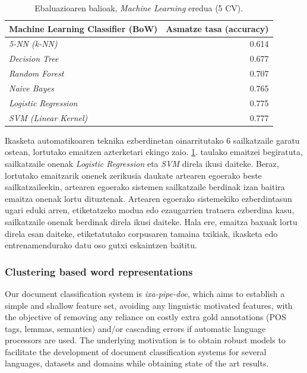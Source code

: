 \documentclass[information,article,submit,moreauthors,pdftex,10pt,a4paper]{Definitions/mdpi}
\begin{document}
\begin{table}[H]
  \centering
  \begin{tabular}{|l|r|}
    \hline
    \textbf{Machine Learning Classifier (BoW)} & \textbf{Asmatze tasa (accuracy)} \\ \hline 
    \textit{5-NN (k-NN)} &  0.614 \\ \hline
    \textit{Decision Tree} &  0.677 \\ \hline
    \textit{Random Forest} &  0.707 \\ \hline
    \textit{Naive Bayes} & 0.765 \\ \hline
    \textit{Logistic Regression} & 0.775 \\ \hline
    \textit{SVM (Linear Kernel)} & 0.777 \\ \hline
  \end{tabular}
  \caption{Ebaluazioaren balioak, \textit{Machine Learning} eredua (5 CV).}
  \label{tab:acc-ml}
\end{table}

Ikasketa automatikoaren teknika ezberdinetan oinarritutako 6 sailkatzaile garatu ostean, lortutako emaitzen azterketari ekingo zaio. \ref{tab:acc-ml}. taulako emaitzei begiratuta, sailkatzaile onenak \textit{Logistic Regression} eta \textit{SVM} direla ikusi daiteke. Beraz, lortutako emaitzarik onenek zerikusia daukate artearen egoerako beste sailkatzaileekin, artearen egoerako sistemen sailkatzaile berdinak izan baitira emaitza onenak lortu dituztenak. Artearen egoerako sistemekiko ezberdintasun ugari eduki arren, etiketatzeko modua edo ezaugarrien trataera ezberdina kasu, sailkatzaile onenak berdinak direla ikusi daiteke. Hala ere, emaitza baxuak lortu direla esan daiteke, etiketatutako corpusaren tamaina txikiak, ikasketa edo entrenamendurako datu oso gutxi eskaintzen baititu.


\subsubsection{Clustering based word representations}\label{sec:ixa}

Our document classification system is \emph{ixa-pipe-doc}, which aims to establish a simple and shallow feature set, avoiding any linguistic motivated features, with the objective of removing any reliance on costly extra gold annotations (POS tags, lemmas, semantics) and/or cascading errors if automatic language processors are used. The underlying motivation is to obtain robust models to facilitate the development of document classification systems for several languages, datasets and domains while obtaining state of the art results.
\end{document}
